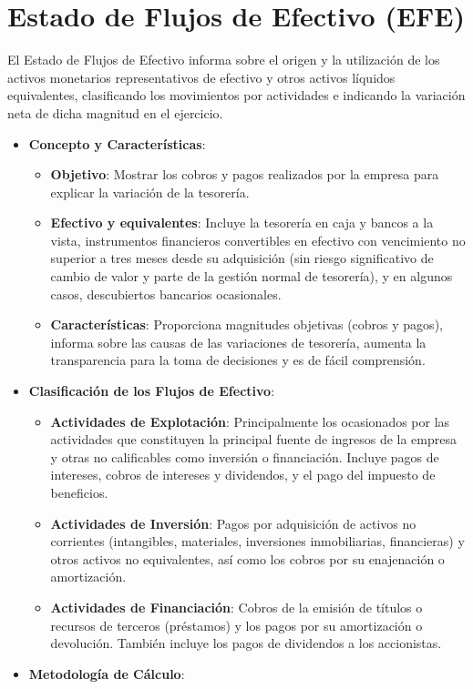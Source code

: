 \documentclass[
  paper=a4,
  ,captions=tableheading
]{scrbook}
\providecommand{\tightlist}{%
  \setlength{\itemsep}{0pt}\setlength{\parskip}{0pt}}
\begin{document}
\hypertarget{estado-de-flujos-de-efectivo-efe}{%
\section{Estado de Flujos de Efectivo
(EFE)}\label{estado-de-flujos-de-efectivo-efe}}

El Estado de Flujos de Efectivo informa sobre el origen y la utilización
de los activos monetarios representativos de efectivo y otros activos
líquidos equivalentes, clasificando los movimientos por actividades e
indicando la variación neta de dicha magnitud en el ejercicio.

\begin{itemize}
\tightlist
\item
  \textbf{Concepto y Características}:

  \begin{itemize}
  \tightlist
  \item
    \textbf{Objetivo}: Mostrar los cobros y pagos realizados por la
    empresa para explicar la variación de la tesorería.
  \item
    \textbf{Efectivo y equivalentes}: Incluye la tesorería en caja y
    bancos a la vista, instrumentos financieros convertibles en efectivo
    con vencimiento no superior a tres meses desde su adquisición (sin
    riesgo significativo de cambio de valor y parte de la gestión normal
    de tesorería), y en algunos casos, descubiertos bancarios
    ocasionales.
  \item
    \textbf{Características}: Proporciona magnitudes objetivas (cobros y
    pagos), informa sobre las causas de las variaciones de tesorería,
    aumenta la transparencia para la toma de decisiones y es de fácil
    comprensión.
  \end{itemize}
\item
  \textbf{Clasificación de los Flujos de Efectivo}:

  \begin{itemize}
  \tightlist
  \item
    \textbf{Actividades de Explotación}: Principalmente los ocasionados
    por las actividades que constituyen la principal fuente de ingresos
    de la empresa y otras no calificables como inversión o financiación.
    Incluye pagos de intereses, cobros de intereses y dividendos, y el
    pago del impuesto de beneficios.
  \item
    \textbf{Actividades de Inversión}: Pagos por adquisición de activos
    no corrientes (intangibles, materiales, inversiones inmobiliarias,
    financieras) y otros activos no equivalentes, así como los cobros
    por su enajenación o amortización.
  \item
    \textbf{Actividades de Financiación}: Cobros de la emisión de
    títulos o recursos de terceros (préstamos) y los pagos por su
    amortización o devolución. También incluye los pagos de dividendos a
    los accionistas.
  \end{itemize}
\item
  \textbf{Metodología de Cálculo}:


\end{itemize}
\end{document}
